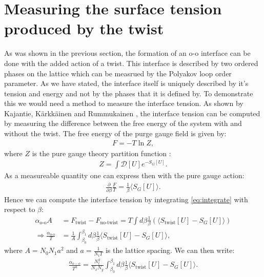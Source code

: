 \documentclass[english,twoside,openright]{UH_TCM_MSc}
\begin{document}
\section{Measuring the surface tension produced by the twist} \label{sec:twist_measure}

As was shown in the previous section, the formation of an o-o interface can be done with the added action of a twist. This interface is described by two ordered phases on the lattice which can be measrued by the Polyakov loop order parameter. As we have stated, the interface itself is uniquely described by it's tension and energy and not by the phases that it is defined by. To demonstrate this we would need a method to measure the interface tension. As shown by Kajantie, Kärkkäinen and Rummukainen \cite{twist}, the interface tension can be computed by measuring the difference between the free energy of the system with and without the twist. The free energy of the purge gauge field is given by:
\begin{align}
    F = -T\ln Z,
\end{align}
where $Z$ is the pure gauge theory partition function \cite{Rothe:1992nt}:
\begin{align}
    Z = \int \mathcal{D}[U] e^{-S_G[U]}.
\end{align}
As a measureable quantity one can express then with the pure gauge action:
\begin{align}
    \frac{\partial}{\partial\beta} \frac{F}{T} = \frac{1}{\beta}\langle S_G[U] \rangle. \label{eq:integrate}
\end{align}
Hence we can compute the interface tension by integrating \ref{eq:integrate} with respect to $\beta$:
\begin{align*}
   \alpha_{\text{o-o}}A &= F_{\text{twist}} - F_{\text{no-twist}} = T\int d\beta \frac{1}{\beta}(\langle S_{\text{twist}}[U] - S_G[U]\rangle) \\
   \Rightarrow \frac{\alpha_{\text{o-o}}}{T} &= \frac{1}{A}\int_{\beta_0}^{\beta_1} d\beta \frac{1}{\beta}\langle S_{\text{twist}}[U] - S_G[U]\rangle,
\end{align*}
where $A=N_0N_1 a^2$ and $a=\frac{1}{N_t T}$ is the lattice spacing. We can then write:
\begin{align*}
    \frac{\alpha_{o-o}}{T^3} = \frac{N_t^2}{N_xN_y}\int_{\beta_0}^{\beta_1} d\beta \frac{1}{\beta}\langle S_{\text{twist}}[U] - S_G[U]\rangle.
\end{align*}
\end{document}
